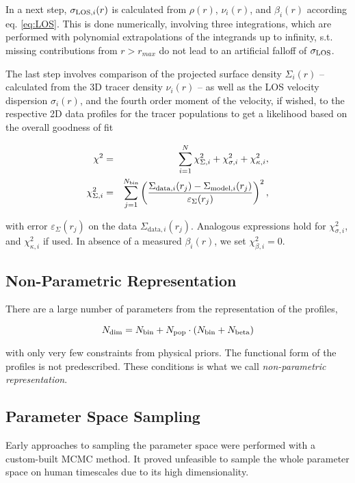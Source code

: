 In a next step, $\sigma_{\text{LOS},i}(r)$ is calculated from $\rho(r)$,
$\nu_i(r)$, and $\beta_i(r)$ according eq. \ref{eq:LOS}. This is done
numerically, involving three integrations, which are performed with
polynomial extrapolations of the integrands up to infinity,
s.t. missing contributions from $r>r_{max}$ do not lead to an
artificial falloff of $\sigma_{\text{LOS}}$.

The last step involves comparison of the projected surface density
$\Sigma_i(r)$ -- calculated from the 3D tracer density $\nu_i(r)$ --
as well as the LOS velocity dispersion $\sigma_i(r)$, and the fourth
order moment of the velocity, if wished, to the respective 2D data
profiles for the tracer populations to get a likelihood based on the
overall goodness of fit

\begin{eqnarray}
    \chi^2 &=& \sum_{i=1}^N \chi_{\Sigma,i}^2 + \chi_{\sigma,i}^2 + \chi_{\kappa,i}^2,\\
    \chi_{\Sigma,i}^2 &=& \sum_{j=1}^{N_{\rm bin}} \left(\frac{\Sigma_{\text{data},i}(r_j)-\Sigma_{\text{model},i}(r_j)}{\varepsilon_\Sigma(r_j)}\right)^2,
\end{eqnarray}

with error $\varepsilon_\Sigma(r_j)$ on the data
$\Sigma_{\text{data},i}(r_j)$. Analogous expressions hold for
$\chi_{\sigma,i}^2$, and $\chi_{\kappa,i}^2$ if used. In absence of a
measured $\beta_i(r)$, we set $\chi_{\beta,i}^2=0$.

\subsection{Non-Parametric Representation}

There are a large number of parameters from the representation of the profiles,

\begin{equation}
    N_{\rm dim} = N_{\rm bin} + N_{\rm pop}\cdot(N_{\rm bin}+N_{\rm beta})
\end{equation}

with only very few constraints from physical priors. The functional
form of the profiles is not predescribed. These conditions is what we
call {\it non-parametric representation}.

\subsection{Parameter Space Sampling}
Early approaches to sampling the parameter space were performed with a
custom-built MCMC method. It proved unfeasible to sample the whole
parameter space on human timescales due to its high dimensionality.

